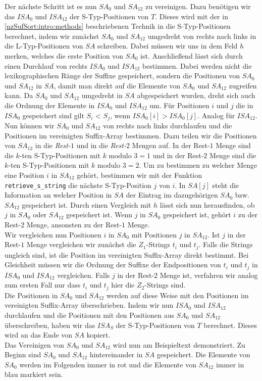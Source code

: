 Der nächste Schritt ist es nun $SA_0$ und $SA_{12}$ zu vereinigen. Dazu benötigen wir das $ISA_0$ und $ISA_{12}$ der S-Typ-Positionen von $T$. Dieses wird mit der in \cref{nzSufSort:intro:methods} beschriebenen Technik in die S-Typ-Positionen berechnet, indem wir zunächst $SA_0$ und $SA_{12}$ umgedreht von rechts nach links in die L-Typ-Positionen von $SA$ schreiben. Dabei müssen wir uns in dem Feld $h$ merken, welches die erste Position von $SA_0$ ist. Anschließend lässt sich durch einen Durchlauf von rechts $ISA_0$ und $ISA_{12}$ bestimmen. Dabei werden nicht die lexikographischen Ränge der Suffixe gespeichert, sondern die Positionen von $SA_0$ und $SA_{12}$ in $SA$, damit man direkt auf die Elemente von $SA_0$ und $SA_{12}$ zugreifen kann. Da $SA_0$ und $SA_{12}$ umgedreht in $SA$ abgespeichert wurden, dreht sich auch die Ordnung der Elemente in $ISA_0$ und $ISA_{12}$ um. Für Positionen $i$ und $j$ die in $ISA_0$ gespeichert sind gilt $S_i$ < $S_j$, wenn $ISA_0[i] > ISA_0[j]$. Analog für $ISA_{12}$. \\
Nun können wir $SA_0$ und $SA_{12}$ von rechts nach links durchlaufen und die Positionen im vereinigten Suffix-Array bestimmen. Dazu teilen wir die Positionen von $SA_{12}$ in die \textit{Rest-$1$} und in die \textit{Rest-$2$} Mengen auf. In der Rest-$1$ Menge sind die $k$-ten S-Typ-Positionen mit $k \text{ modulo } 3 = 1$ und in der Rest-$2$ Menge sind die $k$-ten S-Typ-Positionen mit $k \text{ modulo } 3 = 2$. Um zu bestimmen zu welcher Menge eine Position $i$ in $SA_{12}$ gehört, bestimmen wir mit der Funktion \texttt{retrieve\_s\_string} die nächste S-Typ-Position $j$ von $i$. In $SA[j]$ steht die Information an welcher Position in $SA$ der Eintrag im dazugehörigen $SA_0$ bzw. $SA_{12}$ gespeichert ist. Durch einen Vergleich mit $h$ lässt sich nun herausfinden, ob $j$ in $SA_0$ oder $SA_{12}$ gespeichert ist. Wenn $j$ in $SA_0$ gespeichert ist, gehört $i$ zu der Rest-$2$ Menge, ansonsten zu der Rest-$1$ Menge. \\ 
Wir vergleichen nun Positionen $i$ in $SA_0$ mit Positionen $j$ in $SA_{12}$. Ist $j$ in der Rest-$1$ Menge vergleichen wir zunächst die $Z_1$-Strings $t_i$ und $t_j$. Falls die Strings ungleich sind, ist die Position im vereinigten Suffix-Array direkt bestimmt. Bei Gleichheit müssen wir die Ordnung der Suffixe der Endpositionen von $t_i$ und $t_j$ in $ISA_0$ und $ISA_{12}$ vergleichen. Falls $j$ in der Rest-$2$ Menge ist, verfahren wir analog zum ersten Fall nur dass $t_i$ und $t_j$ hier die $Z_2$-Strings sind. \\
Die Positionen in $SA_0$ und $SA_{12}$ werden auf diese Weise mit den Positionen im vereinigten Suffix-Array überschrieben. Indem wir nun $ISA_0$ und $ISA_{12}$ durchlaufen und die Positionen mit den Positionen aus $SA_0$ und $SA_{12}$ überschreiben, haben wir das $ISA_S$ der S-Typ-Positionen von $T$ berechnet. Dieses wird an das Ende von $SA$ kopiert. \\
Das Vereinigen von $SA_0$ und $SA_{12}$ wird nun am Beispieltext demonstriert. Zu Beginn sind $SA_0$ und $SA_{12}$ hintereinander in $SA$ gespeichert. Die Elemente von $SA_0$ werden im Folgenden immer in rot und die Elemente von $SA_{12}$ immer in blau markiert sein. 

